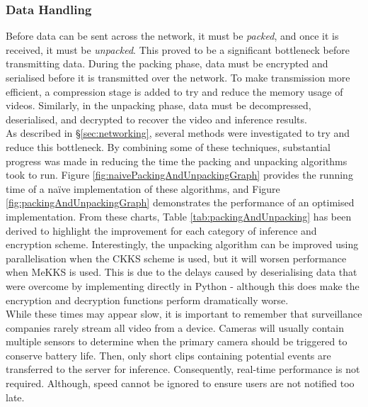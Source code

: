 \subsubsection{Data Handling}
\setlength{\leftskip}{0.5cm}
\indent \indent
Before data can be sent across the network, it must be \textit{packed}, and once it is received, it must be \textit{unpacked}. This proved to be a significant bottleneck before transmitting data. During the packing phase, data must be encrypted and serialised before it is transmitted over the network. To make transmission more efficient, a compression stage is added to try and reduce the memory usage of videos. Similarly, in the unpacking phase, data must be decompressed, deserialised, and decrypted to recover the video and inference results.
\smallskip \\ \indent
As described in §\ref{sec:networking}, several methods were investigated to try and reduce this bottleneck. By combining some of these techniques, substantial progress was made in reducing the time the packing and unpacking algorithms took to run. Figure \ref{fig:naivePackingAndUnpackingGraph} provides the running time of a na\"ive implementation of these algorithms, and Figure \ref{fig:packingAndUnpackingGraph} demonstrates the performance of an optimised implementation. From these charts, Table \ref{tab:packingAndUnpacking} has been derived to highlight the improvement for each category of inference and encryption scheme. Interestingly, the unpacking algorithm can be improved using parallelisation when the CKKS scheme is used, but it will worsen performance when MeKKS is used. This is due to the delays caused by deserialising data that were overcome by implementing directly in Python - although this does make the encryption and decryption functions perform dramatically worse.
\smallskip \\ \indent
While these times may appear slow, it is important to remember that surveillance companies rarely stream all video from a device. Cameras will usually contain multiple sensors to determine when the primary camera should be triggered to conserve battery life. Then, only short clips containing potential events are transferred to the server for inference. Consequently, real-time performance is not required. Although, speed cannot be ignored to ensure users are not notified too late.

